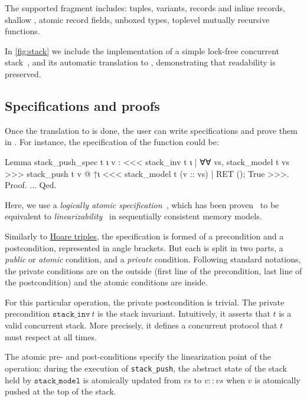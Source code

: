 The supported \OCaml fragment includes: tuples, variants, records and inline records, shallow , atomic record fields, unboxed types, toplevel mutually recursive functions.

In \cref{fig:stack} we include the \OCaml implementation of a simple lock-free concurrent stack~\cite{thomas1986systems}, and its automatic translation to \ZooLang, demonstrating that readability is preserved.

\subsection{Specifications and proofs}
\label{subsec:stack-specs-and-proofs}

Once the translation to \ZooLang is done, the user can write specifications and prove them in \Iris.
For instance, the specification of the  function could be:

\begin{coqcode}
Lemma stack_push_spec t ι v :
  <<< stack_inv t ι
    | ∀∀ vs, stack_model t vs >>>
    stack_push t v @ ↑ι
  <<< stack_model t (v :: vs)
    | RET (); True >>>.
Proof. ... Qed.
\end{coqcode}

Here, we use a \emph{logically atomic specification}~\cite{DBLP:conf/ecoop/PintoDG14}, which has been proven~\cite{DBLP:journals/pacmpl/BirkedalDGJST21} to be equivalent to \emph{linearizability}~\cite{DBLP:journals/toplas/HerlihyW90} in sequentially consistent memory models.

Similarly to \href{https://en.wikipedia.org/wiki/Hoare_logic}{Hoare triples},
the specification is formed of a precondition and a postcondition, represented in angle brackets.
But each is split in two parts, a \emph{public} or \emph{atomic} condition, and a \emph{private} condition.
Following standard \Iris notations, the private conditions are on the outside (first line of the precondition, last line of the postcondition) and the atomic conditions are inside.

For this particular operation, the private postcondition is trivial.
The private precondition $\mathtt{stack\_inv}\ t$ is the stack invariant.
Intuitively, it asserts that $t$ is a valid concurrent stack.
More precisely, it defines a concurrent protocol that $t$ must respect at all times.

The atomic pre- and post-conditions specify the linearization point of the operation: during the execution of \texttt{stack\_push}, the abstract state of the stack held by $\mathtt{stack\_model}$ is atomically updated from $\mathit{vs}$ to $\mathit{v} :: \mathit{vs}$ when $\mathit{v}$ is atomically pushed at the top of the stack.

